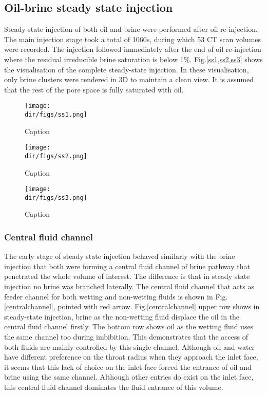 \subsection{Oil-brine steady state injection}
Steady-state injection of both oil and brine were performed after oil re-injection. The main injection stage took a total of 1060s, during which 53 CT scan volumes were recorded. The injection followed immediately after the end of oil re-injection where the residual irreducible brine saturation is below 1\%. Fig.\ref{ss1,ss2,ss3} shows the visualisation of the complete steady-state injection. In these visualisation, only brine clusters were rendered in 3D to maintain a clean view. It is assumed that the rest of the pore space is fully saturated with oil.

\begin{sidewaysfigure}
    \centering
    \texttt{[image: \\dir/figs/ss1.png]}
    \caption{Caption}
    \label{ss1}
\end{sidewaysfigure}

\begin{sidewaysfigure}
    \centering
    \texttt{[image: \\dir/figs/ss2.png]}
    \caption{Caption}
    \label{ss2}
\end{sidewaysfigure}

\begin{sidewaysfigure}
    \centering
    \texttt{[image: \\dir/figs/ss3.png]}
    \caption{Caption}
    \label{ss3}
\end{sidewaysfigure}

\subsubsection{Central fluid channel}
The early stage of steady state injection behaved similarly with the brine injection that both were forming a central fluid channel of brine pathway that penetrated the whole volume of interest. The difference is that in steady state injection no brine was branched laterally. The central fluid channel that acts as feeder channel for both wetting and non-wetting fluids is shown in Fig.\ref{centralchannel}, pointed with red arrow. Fig.\ref{centralchannel} upper row shows in steady-state injection, brine as the non-wetting fluid displace the oil in the central fluid channel firstly. The bottom row shows oil as the wetting fluid uses the same channel too during imbibition. This demonstrates that the access of both fluids are mainly controlled by this single channel. Although oil and water have different preference on the throat radius when they approach the inlet face, it seems that this lack of choice on the inlet face forced the entrance of oil and brine using the same channel. Although other entries do exist on the inlet face, this central fluid channel dominates the fluid entrance of this volume.

